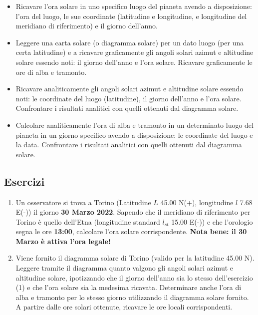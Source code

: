 \documentclass[11pt]{article}
\providecommand{\tightlist}{%
      \setlength{\itemsep}{0pt}\setlength{\parskip}{0pt}}
\begin{document}
\begin{itemize}
\tightlist
\item
  Ricavare l'ora solare in uno specifico luogo del pianeta avendo a
  disposizione: l'ora del luogo, le sue coordinate (latitudine e
  longitudine, e longitudine del meridiano di riferimento) e il giorno
  dell'anno.
\item
  Leggere una carta solare (o diagramma solare) per un dato luogo (per
  una certa latitudine) e a ricavare graficamente gli angoli solari
  azimut e altitudine solare essendo noti: il giorno dell'anno e l'ora
  solare. Ricavare graficamente le ore di alba e tramonto.
\item
  Ricavare analiticamente gli angoli solari azimut e altitudine solare
  essendo noti: le coordinate del luogo (latitudine), il giorno
  dell'anno e l'ora solare. Confrontare i risultati analitici con quelli
  ottenuti dal diagramma solare.
\item
  Calcolare analiticamente l'ora di alba e tramonto in un determinato
  luogo del pianeta in un giorno specifico avendo a disposizione: le
  coordinate del luogo e la data. Confrontare i risultati analitici con
  quelli ottenuti dal diagramma solare.
\end{itemize}

    \hypertarget{esercizi}{%
\subsection{Esercizi}\label{esercizi}}

\begin{enumerate}
\def\labelenumi{\arabic{enumi}.}
\tightlist
\item
  Un osservatore si trova a Torino (Latitudine \(L\) 45.00 N(+),
  longitudine \(l\) 7.68 E(-)) il giorno \textbf{30 Marzo 2022}. Sapendo
  che il meridiano di riferimento per Torino è quello dell'Etna
  (longitudine standard \(l_{st}\) 15.00 E(-)) e che l'orologio segna le
  ore \textbf{13:00}, calcolare l'ora solare corrispondente.
  \textbf{Nota bene: il 30 Marzo è attiva l'ora legale!}
\item
  Viene fornito il diagramma solare di Torino (valido per la latitudine
  45.00 N). Leggere tramite il diagramma quanto valgono gli angoli
  solari azimut e altitudine solare, ipotizzando che il giorno dell'anno
  sia lo stesso dell'esercizio (1) e che l'ora solare sia la medesima
  ricavata. Determinare anche l'ora di alba e tramonto per lo stesso
  giorno utilizzando il diagramma solare fornito. A partire dalle ore
  solari ottenute, ricavare le ore locali corrispondenti.
\end{enumerate}
 
\end{document}

